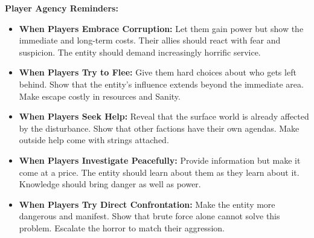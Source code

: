 \documentclass[11pt]{article}
\begin{document}
\textbf{Player Agency Reminders:}
\begin{itemize}
\item \textbf{When Players Embrace Corruption:} Let them gain power but show the immediate and long-term costs. Their allies should react with fear and suspicion. The entity should demand increasingly horrific service.
\item \textbf{When Players Try to Flee:} Give them hard choices about who gets left behind. Show that the entity's influence extends beyond the immediate area. Make escape costly in resources and Sanity.
\item \textbf{When Players Seek Help:} Reveal that the surface world is already affected by the disturbance. Show that other factions have their own agendas. Make outside help come with strings attached.
\item \textbf{When Players Investigate Peacefully:} Provide information but make it come at a price. The entity should learn about them as they learn about it. Knowledge should bring danger as well as power.
\item \textbf{When Players Try Direct Confrontation:} Make the entity more dangerous and manifest. Show that brute force alone cannot solve this problem. Escalate the horror to match their aggression.
\end{itemize}
\end{document}
